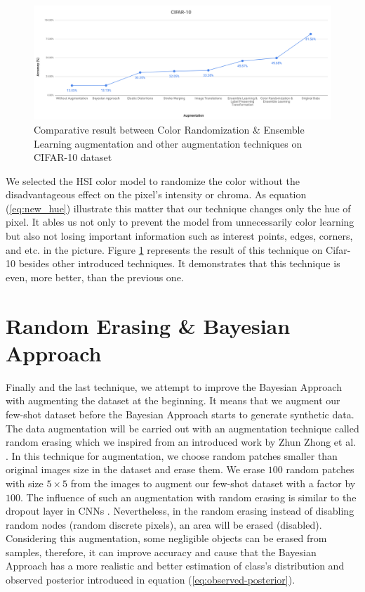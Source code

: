\begin{figure}
  \centering
  \label{fig:cifar_10_random_color_result}
  \includegraphics[width=1\textwidth]{fig/contribution/cifar-10-random-color-result}
  \caption{Comparative result between Color Randomization \& Ensemble Learning augmentation and other augmentation techniques on CIFAR-10 dataset}
\end{figure}

We selected the HSI color model to randomize the color without the disadvantageous effect on the
pixel's intensity or chroma. As equation (\ref{eq:new_hue}) illustrate this matter that our
technique changes only the hue of pixel. It ables us not only to prevent the model from
unnecessarily color learning but also not losing important information such as interest points,
edges, corners, and etc. in the picture. Figure \ref{fig:cifar_10_random_color_result} represents the result
of this technique on Cifar-10 besides other introduced techniques. It demonstrates that this
technique is even, more better, than the previous one.


\section{Random Erasing \& Bayesian Approach}
Finally and the last technique, we attempt to improve the Bayesian Approach with augmenting the
dataset at the beginning. It means that we augment our few-shot dataset before the Bayesian Approach
starts to generate synthetic data. The data augmentation will be carried out with an augmentation
technique called random erasing which we inspired from an introduced work by Zhun Zhong et al.
\cite{random_erasing}. In this technique for augmentation, we choose random patches smaller than
original images size in the dataset and erase them. We erase $100$ random patches with size $5
  \times 5$ from the images to augment our few-shot dataset with a factor by $100$. The influence of
such an augmentation with random erasing is similar to the dropout layer in CNNs \cite{dropout_book}.
Nevertheless, in the random erasing instead of disabling random nodes (random discrete pixels), an
area will be erased (disabled). Considering this augmentation, some negligible objects can be erased
from samples, therefore, it can improve accuracy and cause that the Bayesian Approach has a more
realistic and better estimation of class's distribution and observed posterior introduced in
equation (\ref{eq:observed-posterior}).

